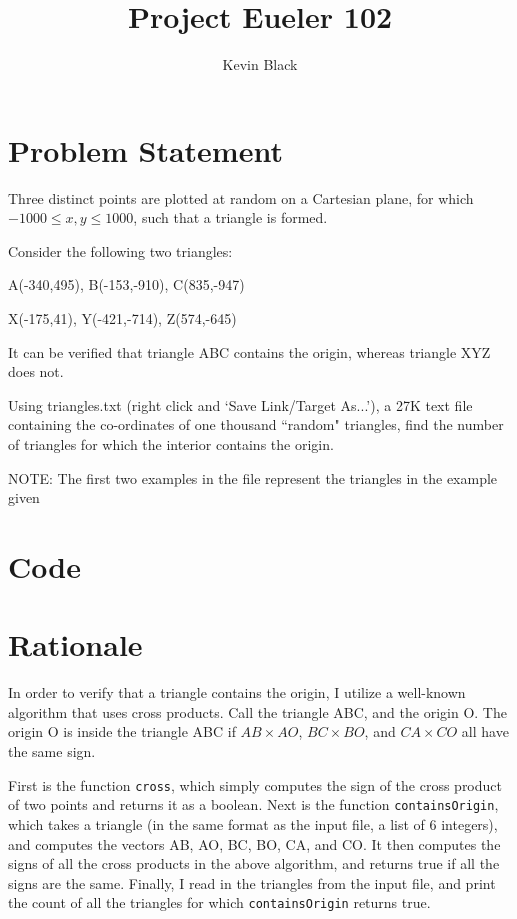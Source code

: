 \documentclass[11pt]{amsart}
\title{\vspace{-1.5cm}Project Eueler 102}
\author{Kevin Black}
\begin{document}
\maketitle

\section{Problem Statement}

Three distinct points are plotted at random on a Cartesian plane, for which $-1000 \leq x, y \leq 1000$, such that a triangle is formed.

Consider the following two triangles:

\begin{center}
A(-340,495), B(-153,-910), C(835,-947)

X(-175,41), Y(-421,-714), Z(574,-645)
\end{center}

It can be verified that triangle ABC contains the origin, whereas triangle XYZ does not.

Using triangles.txt (right click and `Save Link/Target As...'), a 27K text file containing the co-ordinates of one thousand ``random" triangles, find the number of triangles for which the interior contains the origin.

NOTE: The first two examples in the file represent the triangles in the example given 

\section{Code}


\section{Rationale}
In order to verify that a triangle contains the origin, I utilize a well-known algorithm that uses cross products. Call the triangle ABC, and the origin O. The origin O is inside the triangle ABC if $AB \times AO$, $BC \times BO$, and $CA \times CO$ all have the same sign.

First is the function \verb!cross!, which simply computes the sign of the cross product of two points and returns it as a boolean. Next is the function \verb!containsOrigin!, which takes a triangle (in the same format as the input file, a list of 6 integers), and computes the vectors AB, AO, BC, BO, CA, and CO. It then computes the signs of all the cross products in the above algorithm, and returns true if all the signs are the same. Finally, I read in the triangles from the input file, and print the count of all the triangles for which \verb!containsOrigin! returns true. 
\end{document}

